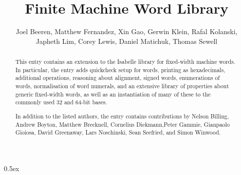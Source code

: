 \documentclass[11pt,a4paper]{article}
\begin{document}
\title{Finite Machine Word Library}
\author{Joel Beeren, Matthew Fernandez, Xin Gao, Gerwin Klein, Rafal Kolanski,\\
       Japheth Lim, Corey Lewis, Daniel Matichuk, Thomas Sewell}
\maketitle

\begin{abstract}
  This entry contains an extension to the Isabelle library for fixed-width
  machine words. In particular, the entry adds quickcheck setup for words,
  printing as hexadecimals, additional operations, reasoning about alignment,
  signed words, enumerations of words, normalisation of word numerals, and an
  extensive library of properties about generic fixed-width words, as well as
  an instantiation of many of these to the commonly used 32 and 64-bit bases.
  
  In addition to the listed authors, the entry contains contributions by
  Nelson Billing, Andrew Boyton, Matthew Brecknell, Cornelius Diekmann,Peter
  Gammie, Gianpaolo Gioiosa, David Greenaway, Lars Noschinski, Sean Seefried,
  and Simon Winwood.
\end{abstract}

\tableofcontents

\parindent 0pt\parskip 0.5ex


\end{document}
